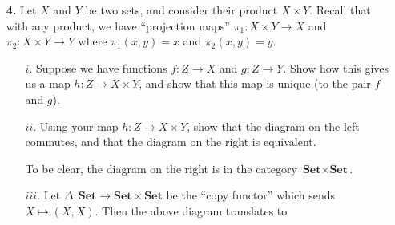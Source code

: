\begin{itemize}
        \item[\textbf{4.}] %
        Let $X$ and $Y$ be two sets, and consider their product $X \times Y$. Recall that with 
        any product, we have ``projection maps'' $\pi_1: X \times Y \to X$ and $\pi_2: X \times Y \to Y$
        where $\pi_1(x,y) = x$ and $\pi_2(x,y) = y$. 
        \begin{itemize}
            \item[$i.$] Suppose we have functions $f: Z \to X$ and $g: Z \to Y$. 
            Show how this gives us a map $h: Z \to X\times Y$, and show that 
            this map is unique (to the pair $f$ and $g$). 
            \item[$ii.$] Using your map $h: Z \to X \times Y$, show that the 
            diagram on the left commutes, and that the diagram on the right is 
            equivalent.  
            \begin{center}
            \end{center}
            To be clear, the diagram on the right is in the category 
            $\textbf{Set}\times \textbf{Set}$. 
            \item[$iii.$]
            Let $\Delta: \textbf{Set}\to \textbf{Set}\times\textbf{Set}$ be 
            the ``copy functor'' which sends $X \mapsto (X, X)$. Then the above diagram 
            translates to 
            \begin{center}

\end{center}
\end{itemize}
\end{itemize}
